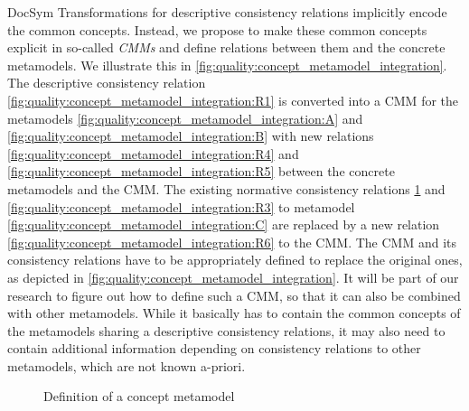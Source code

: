 \begin{copiedFrom}{DocSym}
Transformations for descriptive consistency relations implicitly encode %
the common concepts.
Instead, we propose to make these common concepts explicit in so-called \emph{\glspl{CMM}} and define relations between them and the concrete metamodels.
We illustrate this in \autoref{fig:quality:concept_metamodel_integration}.
The descriptive consistency relation \ref{fig:quality:concept_metamodel_integration:R1} is converted into a \gls{CMM} for the metamodels \ref{fig:quality:concept_metamodel_integration:A} and \ref{fig:quality:concept_metamodel_integration:B} with new relations \ref{fig:quality:concept_metamodel_integration:R4} and \ref{fig:quality:concept_metamodel_integration:R5} between the concrete metamodels and the \gls{CMM}.
The existing normative consistency relations \ref{fig:quality:concept_metamodel_integration} and \ref{fig:quality:concept_metamodel_integration:R3} to metamodel \ref{fig:quality:concept_metamodel_integration:C} are replaced by a new relation \ref{fig:quality:concept_metamodel_integration:R6} to the \gls{CMM}. %
The \gls{CMM} and its consistency relations have to be appropriately defined to replace the original ones, as depicted in \autoref{fig:quality:concept_metamodel_integration}. %
It will be part of our research to figure out how to define such a \gls{CMM}, so that it can also be combined with other metamodels. %
While it basically has to contain the common concepts of the metamodels sharing a descriptive consistency relations, it may also need to contain additional information depending on consistency relations to other metamodels, which are not known a-priori.

\begin{figure}
    \centering
    
    \caption{Definition of a concept metamodel}
    \label{fig:quality:concept_metamodel_integration}
\end{figure}


\end{copiedFrom}
